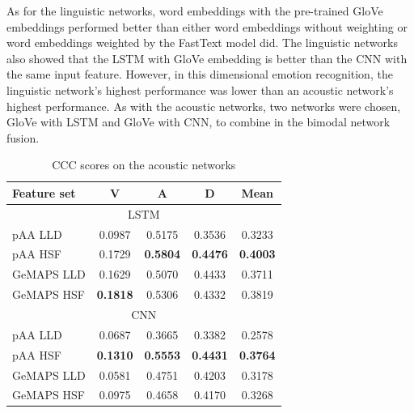 As for the linguistic networks, word embeddings with the pre-trained GloVe
embeddings performed better than either word embeddings without weighting or
word embeddings weighted by the FastText model did. The linguistic networks
also showed that the LSTM with GloVe embedding is better than the CNN with the
same input feature. However, in this dimensional emotion recognition, the
linguistic network's highest performance was lower than an acoustic network's
highest performance. As with the acoustic networks, two networks were chosen,
GloVe with LSTM and GloVe with CNN, to combine in the bimodal network fusion. 

\begin{table}[htpb]
  \caption{CCC scores on the acoustic networks}
  \begin{center}
 \label{tab:acoustic-result}
 \begin{tabular}{l c c c c}
 \hline 
Feature set & V & A & D & Mean \\
\hline \hline
\multicolumn{5}{c}{LSTM} \\
pAA LLD & 0.0987 & 0.5175 & 0.3536 & 0.3233 \\
pAA HSF & 0.1729 & \textbf{0.5804} & \textbf{0.4476} & \textbf{0.4003} \\
GeMAPS LLD & 0.1629 & 0.5070 & 0.4433 & 0.3711 \\
GeMAPS HSF & \textbf{0.1818} & 0.5306 & 0.4332 & 0.3819 \\
 \hline
\multicolumn{5}{c}{CNN} \\ 
pAA LLD & 0.0687 & 0.3665 & 0.3382 & 0.2578 \\
pAA HSF & \textbf{0.1310} & \textbf{0.5553} & \textbf{0.4431} & \textbf{0.3764}
\\
GeMAPS LLD & 0.0581 & 0.4751 & 0.4203 & 0.3178 \\
GeMAPS HSF & 0.0975 & 0.4658 & 0.4170 & 0.3268 \\
 \hline
 \end{tabular}
\end{center}
\end{table} 

